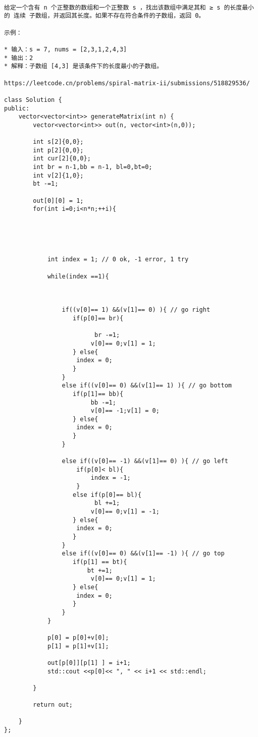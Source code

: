 \documentclass[UTF8]{../computerUniverse}
\begin{document}
\begin{lstlisting}

给定一个含有 n 个正整数的数组和一个正整数 s ，找出该数组中满足其和 ≥ s 的长度最小的 连续 子数组，并返回其长度。如果不存在符合条件的子数组，返回 0。

示例：

* 输入：s = 7, nums = [2,3,1,2,4,3]
* 输出：2
* 解释：子数组 [4,3] 是该条件下的长度最小的子数组。

https://leetcode.cn/problems/spiral-matrix-ii/submissions/518829536/

class Solution {
public:
    vector<vector<int>> generateMatrix(int n) {
        vector<vector<int>> out(n, vector<int>(n,0));

        int s[2]{0,0};
        int p[2]{0,0};
        int cur[2]{0,0};
        int br = n-1,bb = n-1, bl=0,bt=0;
        int v[2]{1,0};
        bt -=1;

        out[0][0] = 1;
        for(int i=0;i<n*n;++i){
            

            
         

            int index = 1; // 0 ok, -1 error, 1 try

            while(index ==1){

             

                if((v[0]== 1) &&(v[1]== 0) ){ // go right
                   if(p[0]== br){
                       
                         br -=1;
                        v[0]== 0;v[1] = 1;
                   } else{
                    index = 0;
                   }
                }
                else if((v[0]== 0) &&(v[1]== 1) ){ // go bottom
                   if(p[1]== bb){
                        bb -=1;
                        v[0]== -1;v[1] = 0;
                   } else{
                    index = 0;
                   }
                }

                else if((v[0]== -1) &&(v[1]== 0) ){ // go left
                    if(p[0]< bl){
                        index = -1;
                    }
                   else if(p[0]== bl){
                         bl +=1;
                        v[0]== 0;v[1] = -1;
                   } else{
                    index = 0;
                   }
                }
                else if((v[0]== 0) &&(v[1]== -1) ){ // go top
                   if(p[1] == bt){
                       bt +=1;
                        v[0]== 0;v[1] = 1;
                   } else{
                    index = 0;
                   }
                }
            }

            p[0] = p[0]+v[0];
            p[1] = p[1]+v[1];

            out[p[0]][p[1] ] = i+1;
            std::cout <<p[0]<< ", " << i+1 << std::endl;

        }

        return out;

    }
};
\end{lstlisting}
\end{document}
